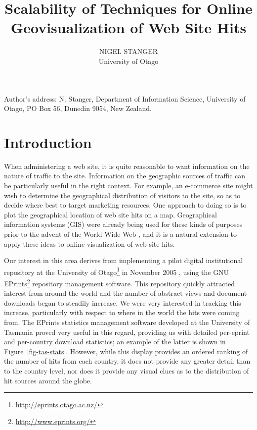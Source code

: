 \documentclass[acmnow]{acmtrans2m}
\title{Scalability of Techniques for Online Geovisualization of Web Site Hits}
\author{NIGEL STANGER \\ University of Otago}
\begin{document}


            
\begin{bottomstuff} 
Author's address: N. Stanger, Department of Information Science,
University of Otago, PO Box 56, Dunedin 9054, New Zealand.
\end{bottomstuff}
            
\maketitle


\section{Introduction}
\label{sec-introduction}

When administering a web site, it is quite reasonable to want
information on the nature of traffic to the site. Information on the
geographic sources of traffic can be particularly useful in the right
context. For example, an e-commerce site might wish to determine the
geographical distribution of visitors to the site, so as to decide
where best to target marketing resources. One approach to doing so
is to plot the geographical location of web site hits on a map.
Geographical information systems (GIS) were already being used for these
kinds of purposes prior to the advent of the World Wide Web
\cite{Beau-JR-1991-GIS}, and it is a natural extension to apply these
ideas to online visualization of web site hits.

Our interest in this area derives from implementing a pilot digital
institutional repository at the University of
Otago\footnote{\url{http://eprints.otago.ac.nz/}} in November 2005
\cite{Stan-N-2006-running}, using the GNU
EPrints\footnote{\url{http://www.eprints.org/}} repository management
software. This repository quickly attracted interest from around the
world and the number of abstract views and document downloads began to
steadily increase. We were very interested in tracking this increase,
particularly with respect to where in the world the hits were coming
from. The EPrints statistics management software developed at the
University of Tasmania \cite{Sale-A-2006-stats} proved very useful in
this regard, providing us with detailed per-eprint and per-country
download statistics; an example of the latter is shown in
Figure~\ref{fig-tas-stats}. However, while this display provides an
ordered ranking of the number of hits from each country, it does not
provide any greater detail than to the country level, nor does it
provide any visual clues as to the distribution of hit sources around
the globe.
\end{document}
